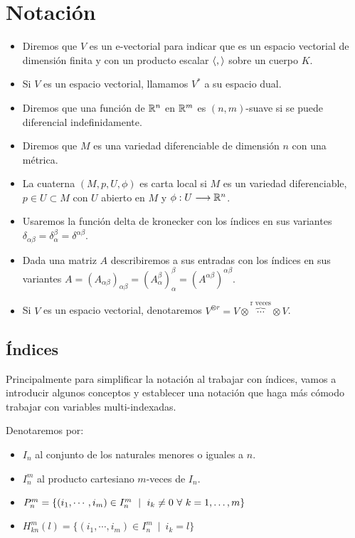 \chapter{Notaci\'on}\label{ch:notacion}
\begin{itemize}
  \item Diremos que $V$ es un e-vectorial para indicar que es un espacio vectorial
  de dimensión finita y con un producto escalar $\langle , \rangle$ sobre un cuerpo $K$.
  \item Si $V$ es un espacio vectorial, llamamos $V^*$ a su espacio dual.
  \item Diremos que una función de $\mathbb{R}^n$ en $\mathbb{R}^m$ es $(n,m)$-suave si se puede diferencial indefinidamente.
  \item Diremos que $M$ es una variedad diferenciable de dimensión $n$ con una métrica.
  \item La cuaterna $(M, p, U, \phi)$ es carta local si $M$ es un variedad diferenciable, $p\in U\subset M$ con $U$ abierto en $M$ y $\phi:U\longrightarrow \mathbb{R}^n$.
  \item Usaremos la función delta de kronecker con los índices en sus variantes
  $\delta_{\alpha\beta}=\delta_\alpha^\beta=\delta^{\alpha\beta}$.
  \item Dada una matriz $A$ describiremos a sus entradas con los índices en sus variantes
  $A=(A_{\alpha\beta})_{\alpha\beta}=(A_\alpha^\beta)_\alpha^\beta=(A^{\alpha\beta})^{\alpha\beta}$.
  \item Si $V$ es un espacio vectorial, denotaremos
  $V^{\otimes r}=V\otimes\overbrace{\cdots}^\text{r\ veces}\otimes V$.
\end{itemize}


\section{\'Indices}\label{sec:indices}
Principalmente para simplificar la notación al trabajar con índices, vamos
a introducir algunos conceptos y establecer una notación que haga más cómodo
trabajar con variables multi-indexadas.

\begin{notation}
  Denotaremos por:
  \begin{itemize}
    \item $I_n$ al conjunto de los naturales menores o iguales a $n$.
    \item $I_n^m$ al producto cartesiano $m$-veces de $I_n$.
    \item $P_n^m=\{(i_1,\cdots,i_m)\in I_n^m\ \mid \ i_k\neq 0\ \forall\ \indexdots{k}{1}{m}\}$
    \item $H_{kn}^m(l)=\{(i_1,\cdots,i_m)\in I_n^m\ \mid \ i_k=l\}$
  \end{itemize}
\end{notation}

